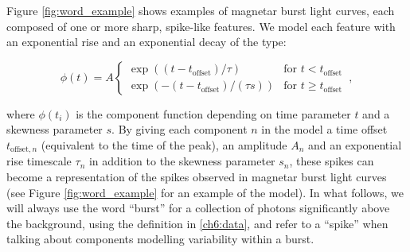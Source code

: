 \documentclass[12pt]{emulateapj}
\newcommand{\word}{\phi}
\begin{document}
Figure \ref{fig:word_example} shows examples of magnetar burst light curves, each composed of one or more sharp, spike-like features.
We model each feature with an exponential rise and an exponential decay of the type:



\begin{equation}
\word(t) = A \left\{\begin{array}{ll}\exp((t-t_{\mathrm{offset}})/\tau) & \mbox{for $t < t_{\mathrm{offset}}$}\\ 
\exp(-(t-t_{\mathrm{offset}})/(\tau s)) & \mbox{for $t \geq t_\mathrm{offset}$}\end{array}\right. \, ,
\label{eqn:word}
\end{equation}

where $\word(t_i)$ is the component function depending on time parameter $t$ and a skewness
parameter $s$. By giving each component $n$ in the model a time offset $t_{\mathrm{offset},n}$ (equivalent to the time of the peak), 
an amplitude $A_n$ and an exponential rise timescale $\tau_n$ in addition to the skewness parameter $s_n$, 
these spikes can become a representation of the spikes observed in magnetar burst light curves (see Figure \ref{fig:word_example}
for an example of the model). In what follows, we will always use the word ``burst'' for a collection of photons significantly above the background,
using the definition in \ref{ch6:data}, and refer to a ``spike'' when talking about components modelling variability within a burst. 
\end{document}
